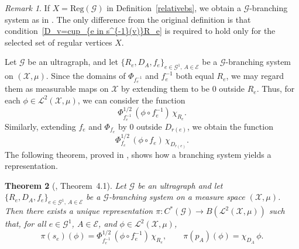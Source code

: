 \documentclass[12pt, reqno]{amsart}
\newtheorem{theorem}{Theorem}[section]
\theoremstyle{definition}
\theoremstyle{remark}
\newtheorem{remark}[theorem]{Remark}
\numberwithin{equation}{section}
\begin{document}
\begin{remark}
If $X=\mathrm{Reg}(\mathcal{G})$ in Definition~\ref{relativebs}, we obtain a
$\mathcal{G}$-branching system as in \cite{DDH}. The only difference from the original definition
is that condition~\eqref{D_v=cup_{e in s^{-1}(v)}R_e} is required to hold only for the selected
set of regular vertices $X$.
\end{remark}




Let $\mathcal{G}$ be an ultragraph, and let
$\{R_e, D_A, f_e\}_{e \in \mathcal{G}^1,\, A \in \mathcal{E}}$ be a
$\mathcal{G}$-branching system on $(\mathcal{X}, \mu)$.
Since the domains of $\Phi_{f_e^{-1}}$ and $f_e^{-1}$ both equal $R_e$, we may regard them as
measurable maps on $\mathcal{X}$ by extending them to be $0$ outside $R_e$. Thus, for each
$\phi \in \mathcal{L}^2(\mathcal{X}, \mu)$, we can consider the function
\[
\Phi_{f_e^{-1}}^{1/2}\, (\phi \circ f_e^{-1})\, \chi_{R_e}.
\]
Similarly, extending $f_e$ and $\Phi_{f_e}$ by $0$ outside $D_{r(e)}$, we obtain the function
\[
\Phi_{f_e}^{1/2}\, (\phi \circ f_e)\, \chi_{D_{r(e)}}.
\]
The following theorem, proved in \cite{DDH}, shows how a branching system yields a representation.

\begin{theorem}[\cite{DDH}, Theorem~4.1]\label{repinducedbybranchingsystems}
Let $\mathcal{G}$ be an ultragraph and let
$\{R_e,D_A,f_e\}_{e\in \mathcal{G}^1,\, A\in \mathcal{E}}$ be a
$\mathcal{G}$-branching system on a measure space $(\mathcal{X},\mu)$. Then there exists a unique
representation $\pi:C^*(\mathcal{G}) \to B(\mathcal{L}^2(\mathcal{X},\mu))$ such that, for all
$e \in \mathcal{G}^1$, $A \in \mathcal{E}$, and $\phi \in \mathcal{L}^2(\mathcal{X},\mu)$,
\[
\pi(s_e)(\phi)=\Phi_{f_e^{-1}}^{1/2}\,(\phi \circ f_e^{-1})\,\chi_{R_e},
\qquad
\pi(p_A)(\phi)=\chi_{D_A}\,\phi.
\]
\end{theorem}
\end{document}

